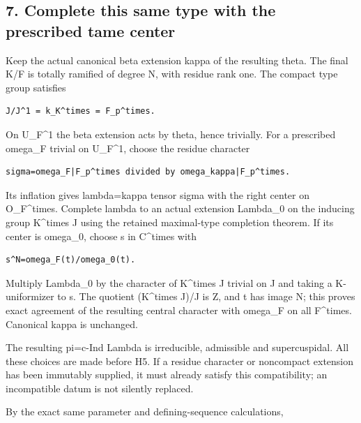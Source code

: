 \hypertarget{odd_character-complete-this-same-type-with-the-prescribed-tame-center}{%
\subsection{7. Complete this same type with the prescribed tame
center}\label{odd_character-complete-this-same-type-with-the-prescribed-tame-center}}

Keep the actual canonical beta extension kappa of the resulting theta.
The final K/F is totally ramified of degree N, with residue rank one.
The compact type group satisfies

\begin{Verbatim}[fontsize=\small,breaklines=true,breakanywhere=true]
J/J^1 = k_K^times = F_p^times.
\end{Verbatim}

On U\_F\^{}1 the beta extension acts by theta, hence trivially. For a
prescribed omega\_F trivial on U\_F\^{}1, choose the residue character

\begin{Verbatim}[fontsize=\small,breaklines=true,breakanywhere=true]
sigma=omega_F|F_p^times divided by omega_kappa|F_p^times.
\end{Verbatim}

Its inflation gives lambda=kappa tensor sigma with the right center on
O\_F\^{}times. Complete lambda to an actual extension Lambda\_0 on the
inducing group K\^{}times J using the retained maximal-type completion
theorem. If its center is omega\_0, choose s in C\^{}times with

\begin{Verbatim}[fontsize=\small,breaklines=true,breakanywhere=true]
s^N=omega_F(t)/omega_0(t).
\end{Verbatim}

Multiply Lambda\_0 by the character of K\^{}times J trivial on J and
taking a K-uniformizer to s. The quotient (K\^{}times J)/J is Z, and t
has image N; this proves exact agreement of the resulting central
character with omega\_F on all F\^{}times. Canonical kappa is unchanged.

The resulting pi=c-Ind Lambda is irreducible, admissible and
supercuspidal. All these choices are made before H5. If a residue
character or noncompact extension has been immutably supplied, it must
already satisfy this compatibility; an incompatible datum is not
silently replaced.

By the exact same parameter and defining-sequence calculations,

